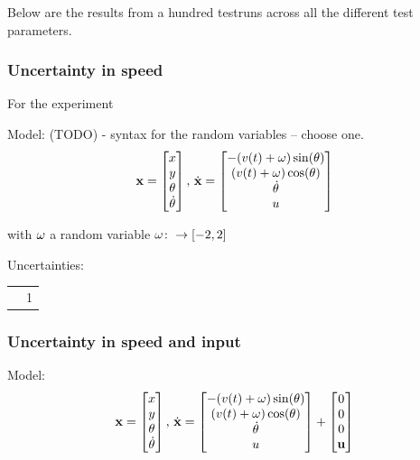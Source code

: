 Below are the results from a hundred testruns across all the different test
parameters.

\subsubsection{Uncertainty in speed}

For the experiment

Model: (TODO) - syntax for the random variables -- choose one.
\begin{equation}
  \label{eq:model-dynamics}
  \mathbf{x} =
  \begin{bmatrix}
    x \\ y \\ \theta \\ \dot{\theta} \\
  \end{bmatrix}, \, \dot{\mathbf{x}} =
  \begin{bmatrix}
    -(v(t) + \mathbf{\omega}{}) \sin(\theta) \\
    (v(t) + \mathbf{\omega}{}) \cos(\theta) \\
    \dot{\theta} \\
    u \\
  \end{bmatrix}
\end{equation}

with \(\mathbf{\omega}{}\) a random variable \(\mathbf{\omega}{} \colon
\rightarrow [-2,2]\)

Uncertainties:
\begin{tabular}{ |c|c| }
  \randomSpeedVar{} & 1 \\
\end{tabular}

\subsubsection{Uncertainty in speed and input}
Model:
\begin{equation}
  \label{eq:model-dynamics}
  \mathbf{x} =
  \begin{bmatrix}
    x \\ y \\ \theta \\ \dot{\theta} \\
  \end{bmatrix}, \, \dot{\mathbf{x}} =
  \begin{bmatrix}
    -(v(t) + \mathbf{\omega}{}) \sin(\theta) \\
    (v(t) + \mathbf{\omega}{}) \cos(\theta) \\
    \dot{\theta} \\
    u \\
  \end{bmatrix}
  +
  \begin{bmatrix}
    0 \\
    0 \\
    0 \\
    {\mathbf{u}}{} \\
  \end{bmatrix}
\end{equation}


